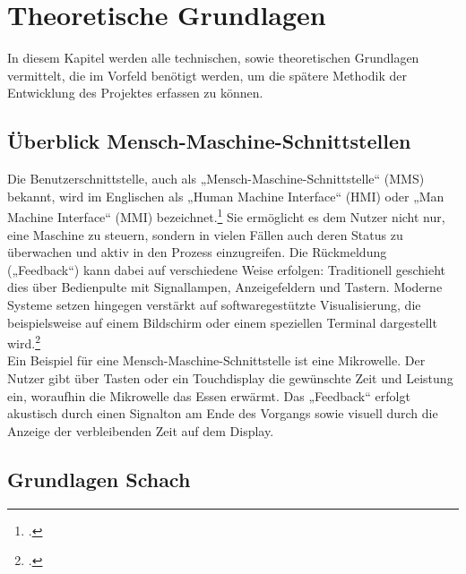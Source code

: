 \documentclass[a4paper]{article}
\begin{document}
\section{Theoretische Grundlagen}
In diesem Kapitel werden alle technischen, sowie theoretischen Grundlagen vermittelt, die im Vorfeld benötigt werden, um die spätere Methodik der Entwicklung des Projektes erfassen zu können.
\label{sec:theorie}
\subsection{Überblick Mensch-Maschine-Schnittstellen}
	
	Die Benutzerschnittstelle, auch als „Mensch-Maschine-Schnittstelle“ (MMS) bekannt, wird im Englischen als „Human Machine Interface“ (HMI) oder „Man Machine Interface“ (MMI) bezeichnet.\footcite{wikipedia_Benutzerschnittstelle} Sie ermöglicht es dem Nutzer nicht nur, eine Maschine zu steuern, sondern in vielen Fällen auch deren Status zu überwachen und aktiv in den Prozess einzugreifen. Die Rückmeldung („Feedback“) kann dabei auf verschiedene Weise erfolgen: Traditionell geschieht dies über Bedienpulte mit Signallampen, Anzeigefeldern und Tastern. Moderne Systeme setzen hingegen verstärkt auf softwaregestützte Visualisierung, die beispielsweise auf einem Bildschirm oder einem speziellen Terminal dargestellt wird.\footcite{elektrotechnik}\\[1ex]
	Ein Beispiel für eine Mensch-Maschine-Schnittstelle ist eine Mikrowelle. Der Nutzer gibt über Tasten oder ein Touchdisplay die gewünschte Zeit und Leistung ein, woraufhin die Mikrowelle das Essen erwärmt. Das „Feedback“ erfolgt akustisch durch einen Signalton am Ende des Vorgangs sowie visuell durch die Anzeige der verbleibenden Zeit auf dem Display.
	
\subsection{Grundlagen Schach}
	
\end{document}
